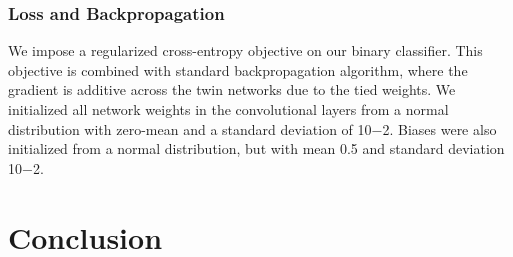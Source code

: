 \documentclass[runningheads]{llncs}
\begin{document}


\subsubsection{Loss and Backpropagation}
 We impose a regularized cross-entropy objective on our binary classifier.
This objective is combined with standard backpropagation algorithm, where the gradient is additive across the twin networks due to the tied weights.
 We initialized all network weights in the convolutional layers from a normal distribution with zero-mean and a standard deviation of 10−2. Biases were also initialized from a normal distribution, but with mean 0.5 and standard deviation 10−2.

\section{Conclusion}

%
%
%
%
%
%






\end{document}
